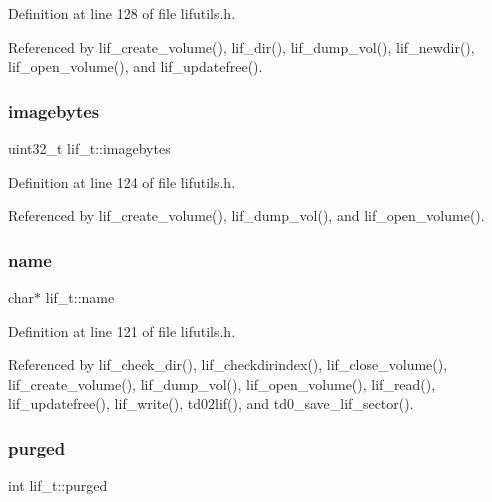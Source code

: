 Definition at line 128 of file lifutils.\+h.



Referenced by lif\+\_\+create\+\_\+volume(), lif\+\_\+dir(), lif\+\_\+dump\+\_\+vol(), lif\+\_\+newdir(), lif\+\_\+open\+\_\+volume(), and lif\+\_\+updatefree().

\mbox{\label{structlif__t_afabd64e66adb03eef2249b6c627faac7}} 
\subsubsection{\texorpdfstring{imagebytes}{imagebytes}}
{\footnotesize\ttfamily uint32\+\_\+t lif\+\_\+t\+::imagebytes}



Definition at line 124 of file lifutils.\+h.



Referenced by lif\+\_\+create\+\_\+volume(), lif\+\_\+dump\+\_\+vol(), and lif\+\_\+open\+\_\+volume().

\mbox{\label{structlif__t_ae6b943f3c26005fc375169960e9049f7}} 
\subsubsection{\texorpdfstring{name}{name}}
{\footnotesize\ttfamily char$\ast$ lif\+\_\+t\+::name}



Definition at line 121 of file lifutils.\+h.



Referenced by lif\+\_\+check\+\_\+dir(), lif\+\_\+checkdirindex(), lif\+\_\+close\+\_\+volume(), lif\+\_\+create\+\_\+volume(), lif\+\_\+dump\+\_\+vol(), lif\+\_\+open\+\_\+volume(), lif\+\_\+read(), lif\+\_\+updatefree(), lif\+\_\+write(), td02lif(), and td0\+\_\+save\+\_\+lif\+\_\+sector().

\mbox{\label{structlif__t_a1dfef3ca99d6ba9680bb9b6bf8fafc32}} 
\subsubsection{\texorpdfstring{purged}{purged}}
{\footnotesize\ttfamily int lif\+\_\+t\+::purged}



